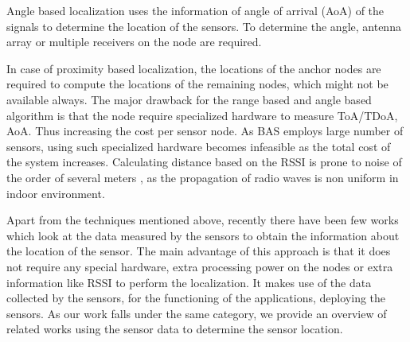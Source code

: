 Angle based  localization uses the information of angle of arrival (AoA) of the signals to determine the location of the sensors\cite{nasipuri2002directionality,rong2006angle}. To determine the angle, antenna array or multiple receivers on the node are required.

In case of proximity based localization, the locations of the anchor nodes are required to compute the locations of the remaining nodes, which might not be available always. The major drawback for the range based and angle based algorithm is that the node require specialized hardware to measure ToA/TDoA, AoA\cite{4317866}. Thus increasing the cost per sensor node. As BAS employs large number of sensors, using such specialized hardware becomes infeasible as the total cost of the system increases. Calculating distance based on the RSSI is prone to noise of the order of several meters \cite{bachrach2005localization}, as the propagation of radio waves is non uniform in indoor environment.



Apart from the techniques mentioned above, recently there have been few works which look at the data measured by the sensors to obtain the information about the location of the sensor. The main advantage of this approach is that it does not require any special hardware, extra processing power on the nodes or extra information like RSSI to perform the localization. It makes use of the data collected by the sensors, for the functioning of the applications, deploying the sensors. As our work falls under the same category, we provide an overview of related works using the sensor data to determine the sensor location. 

